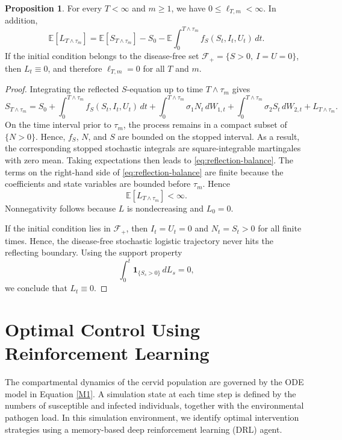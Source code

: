 \documentclass[12pt,a4paper,reqno]{amsart}
\theoremstyle{definition}
\newtheorem{proposition}[theorem]{Proposition}
\theoremstyle{remark}
\theoremstyle{plain}
\begin{document}
\begin{proposition}
\label{prop:reflection-rate}
For every $T<\infty$ and $m\ge 1$, we have $0\le \ell_{T,m}<\infty$. In addition,
\begin{equation}\label{eq:reflection-balance}
\mathbb E[L_{T\wedge\tau_m}]=\mathbb E[S_{T\wedge\tau_m}]-S_0-\mathbb E\int_0^{T\wedge\tau_m} f_S(S_t,I_t,U_t)\,dt.
\end{equation}
If the initial condition belongs to the disease-free set $\mathcal F_+=\{S>0,\ I=U=0\}$, then $L_t\equiv 0$, and therefore $\ell_{T,m}=0$ for all $T$ and $m$.
\end{proposition}

\begin{proof}
Integrating the reflected $S$-equation up to time $T\wedge\tau_m$ gives
$$
S_{T\wedge\tau_m}=S_0
+\int_0^{T\wedge\tau_m} f_S(S_t,I_t,U_t)\,dt
+\int_0^{T\wedge\tau_m}\sigma_1N_t\,dW_{1,t}
+\int_0^{T\wedge\tau_m}\sigma_2S_t\,dW_{2,t}
+L_{T\wedge\tau_m}.
$$
On the time interval prior to $\tau_m$, the process remains in a compact subset of $\{N>0\}$. Hence, $f_S$, $N$, and $S$ are bounded on the stopped interval. As a result, the corresponding stopped stochastic integrals are square-integrable martingales with zero mean. Taking expectations then leads to \eqref{eq:reflection-balance}. The terms on the right-hand side of \eqref{eq:reflection-balance} are finite because the coefficients and state variables are bounded before $\tau_m$. Hence
$$
\mathbb E[L_{T\wedge\tau_m}]<\infty.
$$
Nonnegativity follows because $L$ is nondecreasing and $L_0=0$.

If the initial condition lies in $\mathcal F_+$, then $I_t = U_t = 0$ and $N_t = S_t > 0$ for all finite times. Hence, the disease-free stochastic logistic trajectory never hits the reflecting boundary. Using the support property
$$
\int_0^t \mathbf 1_{\{S_s>0\}}\,dL_s = 0,
$$
we conclude that $L_t \equiv 0$.
\end{proof}


\section{Optimal Control Using Reinforcement Learning}\label{Sec:Env}
The compartmental dynamics of the cervid population are governed by the ODE model in Equation \ref{M1}. A simulation state at each time step is defined by the numbers of susceptible and infected individuals, together with the environmental pathogen load. In this simulation environment, we identify optimal intervention strategies using a memory-based deep reinforcement learning (DRL) agent.
\end{document}
